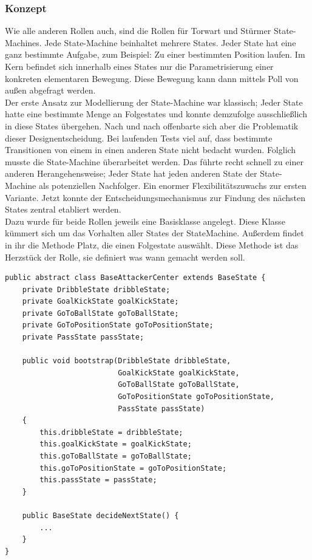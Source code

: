 \documentclass[fontsize=12pt,a4paper,final]{scrartcl}[2003/01/01]
\begin{document}
\subsubsection{Konzept}

Wie alle anderen Rollen auch, sind die Rollen für Torwart und Stürmer State-Machines. Jede State-Machine beinhaltet mehrere States. Jeder State hat eine ganz bestimmte Aufgabe, zum Beispiel: Zu einer bestimmten Position laufen. Im Kern befindet sich innerhalb eines States nur die Parametrisierung einer konkreten elementaren Bewegung. Diese Bewegung kann dann mittels Poll von außen abgefragt werden.
\\

Der erste Ansatz zur Modellierung der State-Machine war klassisch; Jeder State hatte eine bestimmte Menge an Folgestates und konnte demzufolge ausschließlich in diese States übergehen. Nach und nach offenbarte sich aber die Problematik dieser Designentscheidung. Bei laufenden Tests viel auf, dass bestimmte Transitionen von einem in einen anderen State nicht bedacht wurden. Folglich musste die State-Machine überarbeitet werden. Das führte recht schnell zu einer anderen Herangehensweise; Jeder State hat jeden anderen State der State-Machine als potenziellen Nachfolger. Ein enormer Flexibilitätszuwachs zur ersten Variante. Jetzt konnte der Entscheidungsmechanismus zur Findung des nächsten States  zentral etabliert werden. 
\\

Dazu wurde für beide Rollen jeweils eine Basisklasse angelegt. Diese Klasse kümmert sich um das Vorhalten aller States der StateMachine. Außerdem findet in ihr die Methode Platz, die einen Folgestate auswählt. Diese Methode ist das Herzstück der Rolle, sie definiert was wann gemacht werden soll.
\\

\begin{lstlisting}[caption=Beispiel Basisklasse Stürmer, captionpos=b, label=Beispiel Basisklasse Stürmer]
public abstract class BaseAttackerCenter extends BaseState {
    private DribbleState dribbleState;
    private GoalKickState goalKickState;
    private GoToBallState goToBallState;
    private GoToPositionState goToPositionState;
    private PassState passState;

    public void bootstrap(DribbleState dribbleState, 
    					  GoalKickState goalKickState, 
    					  GoToBallState goToBallState, 
                          GoToPositionState goToPositionState, 
                          PassState passState) 
    {
        this.dribbleState = dribbleState;
        this.goalKickState = goalKickState;
        this.goToBallState = goToBallState;
        this.goToPositionState = goToPositionState;
        this.passState = passState;
    }

    public BaseState decideNextState() {
        ...
    }
}
\end{lstlisting}
\end{document}
